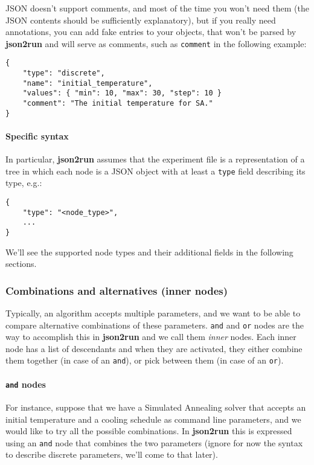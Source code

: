 \documentclass[11pt,notitlepage,twoside,a4paper]{article}
\begin{document}
JSON doesn't support comments, and most of the time you won't need them
(the JSON contents should be sufficiently explanatory), but if you
really need annotations, you can add fake entries to your objects, that
won't be parsed by \textbf{json2run} and will serve as comments, such as
\texttt{comment} in the following example:

\begin{small}
\begin{lstlisting} 
{ 
    "type": "discrete", 
    "name": "initial_temperature", 
    "values": { "min": 10, "max": 30, "step": 10 }
    "comment": "The initial temperature for SA."
}
\end{lstlisting}
\end{small}

\noindent
\paragraph{Specific syntax}
In particular, \textbf{json2run} assumes that the experiment file is a
representation of a tree in which each node is a JSON object with at
least a \texttt{type} field describing its type, e.g.:

\begin{lstlisting} 
{
    "type": "<node_type>",
    ... 
}
\end{lstlisting}

\noindent
We'll see the supported node types and their additional fields in the
following sections.

\subsubsection{Combinations and alternatives (inner nodes)}

Typically, an algorithm accepts multiple parameters, and we want to be
able to compare alternative combinations of these parameters.
\texttt{and} and \texttt{or} nodes are the way to accomplish this in
\textbf{json2run} and we call them \emph{inner} nodes. Each inner node
has a list of descendants and when they are activated, they either
combine them together (in case of an \texttt{and}), or pick between them
(in case of an \texttt{or}).

\paragraph{\texttt{and} nodes}

For instance, suppose that we have a Simulated Annealing \cite{Kirkpatrick1983} solver that accepts an initial temperature and a
cooling schedule as command line parameters, and we would like to try
all the possible combinations. In \textbf{json2run} this is expressed
using an \texttt{and} node that combines the two parameters (ignore for
now the syntax to describe discrete parameters, we'll come to that
later).
\end{document}
